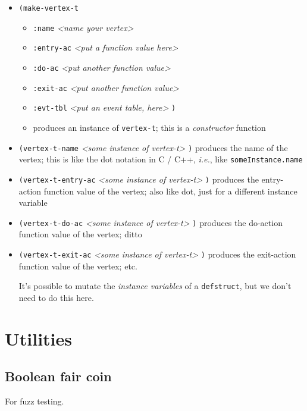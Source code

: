 \documentclass[10pt,oneside,x11names]{article}
\begin{document}
\begin{itemize}
\item \texttt{(make-vertex-t}
\begin{itemize}
\item \texttt{:name} \emph{<name your vertex>}
\item \texttt{:entry-ac} \emph{<put a function value here>}
\item \texttt{:do-ac} \emph{<put another function value>}
\item \texttt{:exit-ac} \emph{<put another function value>}
\item \texttt{:evt-tbl} \emph{<put an event table, here>} \texttt{)}
\item produces an instance of \texttt{vertex-t}; this is a \emph{constructor} function
\end{itemize}

\item \texttt{(vertex-t-name} \emph{<some instance of vertex-t>} \texttt{)} produces the name of the
vertex; this is like the dot notation in C / C++, \emph{i.e.}, like \texttt{someInstance.name}

\item \texttt{(vertex-t-entry-ac} \emph{<some instance of vertex-t>} \texttt{)} produces the
entry-action function value of the vertex; also like dot, just for a
different instance variable

\item \texttt{(vertex-t-do-ac} \emph{<some instance of vertex-t>} \texttt{)} produces the
do-action function value of the vertex; ditto

\item \texttt{(vertex-t-exit-ac} \emph{<some instance of vertex-t>} \texttt{)} produces the
exit-action function value of the vertex; etc.

It's possible to mutate the \emph{instance variables} of a \texttt{defstruct}, but we
don't need to do this here.
\end{itemize}

\section{Utilities}
\label{sec:orgb9d214a}
\subsection{Boolean fair coin}
\label{sec:orgdbe2c35}

For fuzz testing.
\end{document}
